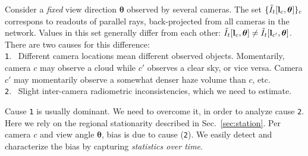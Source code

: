 \documentclass[runningheads]{llncs}
\begin{document}
%
%

Consider a {\em fixed} view direction ${\bm \theta}$ observed by several cameras.
The set $\{\tilde I_t[{\bf l}_c,{\bm \theta}]\}_c$ correspons to readouts of parallel rays, back-projected from all cameras in the network. Values in this set generally differ from each other:
 $\tilde I_t[{\bf l}_c,{\bm \theta}]\neq \tilde I_t[{\bf l}_{c'},{\bm \theta}]$. There are two causes for this difference:\\
 {\tt 1}.~ Different camera locations mean different observed objects. Momentarily, camera $c$ may observe a cloud while $c'$ observes a clear sky, or vice versa. Camera $c'$ may momentarily observe a somewhat denser haze volume than $c$, etc. \\
 {\tt 2}.~ Slight inter-camera radiometric inconsistencies, which we need to estimate.\\
 \vspace{-0.2cm}

Cause {\tt 1} is usually dominant. We need to overcome it, in order to analyze cause {\tt 2}. Here we rely on the regional stationarity described in Sec.~\ref{sec:station}.
Per camera $c$ and view angle ${\bm \theta}$, bias is due to cause ({\tt 2}). We easily detect and characterize the bias by capturing {\em statistics over time}.
\end{document}
